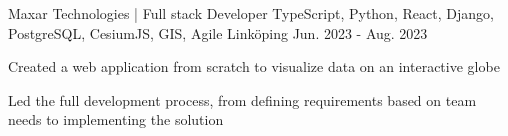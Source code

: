 \begin{cventries}
	\cventry
	{Maxar Technologies | Full stack Developer} %
	{TypeScript, Python, React, Django, PostgreSQL, CesiumJS, GIS, Agile} %
	{Linköping} %
	{Jun. 2023 - Aug. 2023} %
	{
		\begin{cvitems} %
			\item {Created a web application from scratch to visualize data on an interactive globe}
			\item {Led the full development process, from defining requirements based on team needs to implementing the solution}
		\end{cvitems}
	}

\end{cventries}
